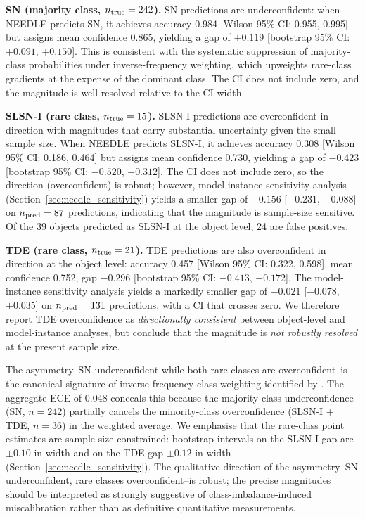 \documentclass[twocolumn]{aastex631}
\begin{document}
\textbf{SN (majority class, $n_{\rm true} = 242$).} SN predictions are
underconfident: when NEEDLE predicts SN, it achieves accuracy 0.984
[Wilson 95\% CI: 0.955, 0.995] but assigns mean confidence 0.865,
yielding a gap of $+0.119$ [bootstrap 95\% CI: $+0.091$, $+0.150$].
This is consistent with the systematic suppression of majority-class
probabilities under inverse-frequency weighting, which upweights
rare-class gradients at the expense of the dominant class. The CI does
not include zero, and the magnitude is well-resolved relative to the
CI width.

\textbf{SLSN-I (rare class, $n_{\rm true} = 15$).} SLSN-I predictions
are overconfident in direction with magnitudes that carry substantial
uncertainty given the small sample size. When NEEDLE predicts SLSN-I,
it achieves accuracy 0.308 [Wilson 95\% CI: 0.186, 0.464] but assigns
mean confidence 0.730, yielding a gap of $-0.423$ [bootstrap 95\% CI:
$-0.520$, $-0.312$]. The CI does not include zero, so the direction
(overconfident) is robust; however, model-instance sensitivity analysis
(Section~\ref{sec:needle_sensitivity}) yields a smaller gap of $-0.156$
[$-0.231$, $-0.088$] on $n_{\rm pred} = 87$ predictions, indicating
that the magnitude is sample-size sensitive. Of the 39 objects predicted
as SLSN-I at the object level, 24 are false positives.

\textbf{TDE (rare class, $n_{\rm true} = 21$).} TDE predictions are
also overconfident in direction at the object level: accuracy 0.457
[Wilson 95\% CI: 0.322, 0.598], mean confidence 0.752, gap $-0.296$
[bootstrap 95\% CI: $-0.413$, $-0.172$]. The model-instance sensitivity
analysis yields a markedly smaller gap of $-0.021$ [$-0.078$, $+0.035$]
on $n_{\rm pred} = 131$ predictions, with a CI that crosses zero. We
therefore report TDE overconfidence as \textit{directionally consistent}
between object-level and model-instance analyses, but conclude that
the magnitude is \textit{not robustly resolved} at the present
sample size.

The asymmetry--SN underconfident while both rare classes are overconfident--is the canonical signature of inverse-frequency class weighting identified by \citet{vandengoorbergh2022}. The aggregate ECE of 0.048 conceals this because the majority-class underconfidence (SN, $n = 242$) partially cancels the minority-class overconfidence (SLSN-I + TDE, $n = 36$) in the weighted average. We emphasise that the rare-class point estimates are sample-size constrained: bootstrap intervals on the SLSN-I gap are $\pm 0.10$ in width and on the TDE gap $\pm 0.12$ in width (Section~\ref{sec:needle_sensitivity}). The qualitative direction of the asymmetry--SN underconfident, rare classes overconfident--is robust; the precise magnitudes should be interpreted as strongly suggestive of class-imbalance-induced miscalibration rather than as definitive quantitative measurements.
\end{document}
